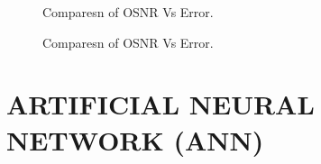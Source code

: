 \documentclass[12pt]{report}
\begin{document}
	\begin{figure}[htbp]
		\caption{Comparesn of OSNR Vs Error.}
		\label{fig1}
	\end{figure}
	\begin{figure}[htbp]
		\caption{Comparesn of OSNR Vs Error.}
		\label{fig1}
	\end{figure}


\chapter{ARTIFICIAL NEURAL NETWORK (ANN)}
\end{document}
